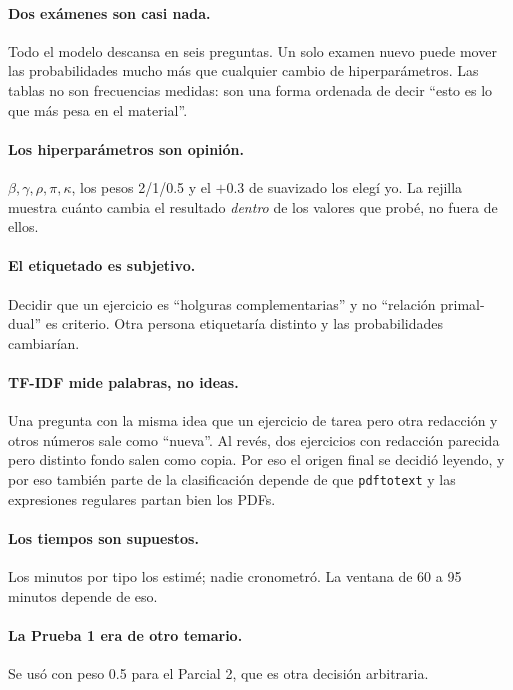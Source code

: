 \documentclass[11pt]{article}
\newcommand{\cod}[1]{\texttt{#1}}
\begin{document}
\paragraph{Dos exámenes son casi nada.} Todo el modelo descansa en seis preguntas. Un solo
examen nuevo puede mover las probabilidades mucho más que cualquier cambio de hiperparámetros.
Las tablas no son frecuencias medidas: son una forma ordenada de decir ``esto es lo que más
pesa en el material''.

\paragraph{Los hiperparámetros son opinión.} $\beta,\gamma,\rho,\pi,\kappa$, los pesos 2/1/0.5
y el $+0.3$ de suavizado los elegí yo. La rejilla muestra cuánto cambia el resultado
\emph{dentro} de los valores que probé, no fuera de ellos.

\paragraph{El etiquetado es subjetivo.} Decidir que un ejercicio es ``holguras
complementarias'' y no ``relación primal-dual'' es criterio. Otra persona etiquetaría distinto
y las probabilidades cambiarían.

\paragraph{TF-IDF mide palabras, no ideas.} Una pregunta con la misma idea que un ejercicio de
tarea pero otra redacción y otros números sale como ``nueva''. Al revés, dos ejercicios con
redacción parecida pero distinto fondo salen como copia. Por eso el origen final se decidió
leyendo, y por eso también parte de la clasificación depende de que \cod{pdftotext} y las
expresiones regulares partan bien los PDFs.

\paragraph{Los tiempos son supuestos.} Los minutos por tipo los estimé; nadie cronometró. La
ventana de 60 a 95 minutos depende de eso.

\paragraph{La Prueba 1 era de otro temario.} Se usó con peso 0.5 para el Parcial 2, que es
otra decisión arbitraria.
\end{document}
